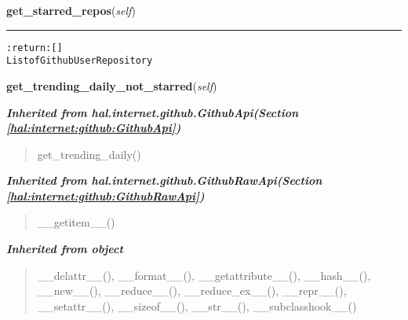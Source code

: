 \hspace{.8\funcindent}\begin{boxedminipage}{\funcwidth}

    \raggedright \textbf{get\_starred\_repos}(\textit{self})

    \vspace{-1.5ex}

    \rule{\textwidth}{0.5\fboxrule}
\setlength{\parskip}{2ex}
\begin{alltt}

:return: []
    List of GithubUserRepository
\end{alltt}

\setlength{\parskip}{1ex}
    \end{boxedminipage}

    \label{hal:internet:github:GithubUser:get_trending_daily_not_starred}

    \vspace{0.5ex}

\hspace{.8\funcindent}\begin{boxedminipage}{\funcwidth}

    \raggedright \textbf{get\_trending\_daily\_not\_starred}(\textit{self})

\setlength{\parskip}{2ex}
\setlength{\parskip}{1ex}
    \end{boxedminipage}


\large{\textbf{\textit{Inherited from hal.internet.github.GithubApi\textit{(Section \ref{hal:internet:github:GithubApi})}}}}

\begin{quote}
get\_trending\_daily()
\end{quote}

\large{\textbf{\textit{Inherited from hal.internet.github.GithubRawApi\textit{(Section \ref{hal:internet:github:GithubRawApi})}}}}

\begin{quote}
\_\_getitem\_\_()
\end{quote}

\large{\textbf{\textit{Inherited from object}}}

\begin{quote}
\_\_delattr\_\_(), \_\_format\_\_(), \_\_getattribute\_\_(), \_\_hash\_\_(), \_\_new\_\_(), \_\_reduce\_\_(), \_\_reduce\_ex\_\_(), \_\_repr\_\_(), \_\_setattr\_\_(), \_\_sizeof\_\_(), \_\_str\_\_(), \_\_subclasshook\_\_()
\end{quote}

